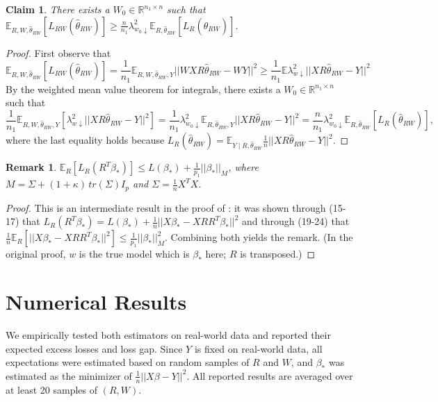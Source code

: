 \documentclass[a4paper,fleqn]{cas-sc}
\theoremstyle{plain}
\newtheorem{remark}[theorem]{Remark}
\newtheorem{claim}[theorem]{Claim}
\newcommand{\R}{\mathbb{R}}
\newcommand{\E}{\mathbb{E}}
\newcommand{\be}{\beta}
\newcommand{\hte}{\hat{\theta}}
\begin{document}
\begin{claim}
\label{claim:05}
There exists a $W_0 \in \R^{n_1 \times 
n}$ such that
$\E_{R, W, \hte_{RW}} 
[L_{RW}(\hte_{RW})] \geq \frac{n}{n_1} 
\lambda^2_{w_0 \downarrow} 
\E_{R, \hte_{RW}} [L_{R}(\hte_{RW})]$. 
\end{claim}
\begin{proof}
First observe that 
\begin{equation}
\E_{R, W, \hte_{RW}} 
[L_{RW}(\hte_{RW})] 
= \frac{1}{n_1} 
\E_{R, W, \hte_{RW}, Y} 
||WXR \hte_{RW} - WY ||^2 
\geq \frac{1}{n_1} 
\E \lambda^2_{w \downarrow} 
||XR \hte_{RW} - Y||^2
\end{equation}    
By the weighted mean value theorem for integrals, there exists a $W_0 \in \R^{n_1 \times n}$ such that 
\begin{equation}
\frac{1}{n_1} 
\E_{R, W, \hte_{RW}, Y}[   
\lambda^2_{w \downarrow} 
||XR \hte_{RW} - Y||^2] 
= \frac{1}{n_1} 
\lambda^2_{w_0 \downarrow} 
\E_{R, \hte_{RW}, Y} 
||XR \hte_{RW} - Y||^2
= \frac{n}{n_1} 
\lambda^2_{w_0 \downarrow} 
\E_{R, \hte_{RW}} [L_R(\hte_{RW})], 
\end{equation}    
where the last equality 
holds because $L_R(\hte_{RW}) 
= \E_{Y \mid R, \hte_{RW}} 
\frac{1}{n} ||XR \hte_{RW} - Y||^2$.
\end{proof}
 
\begin{remark}
\label{rem:priorkaban}
$\E_{R} [L_{R}(R^T\be_*)] 
\leq L(\be_*) + \frac{1}{p_1} 
||\be_*||_M$, 
where $M = \Sigma + (1+\kappa)\, 
tr(\Sigma) I_p$ and 
$\Sigma = \frac{1}{n} X^T X$.     
\end{remark}
\begin{proof}
This is an intermediate result 
in the proof of \citep[Theorem 1]{kaban2014new}: it was shown 
through (15-17) that 
$L_R(R^T \be_*) 
= L(\be_*) + 
\frac{1}{n} ||X \be_* 
- X R R^T \be_*||^2$ 
and through (19-24) that 
$\frac{1}{n} \E_{R} \left[ ||X \be_* 
- X R R^T \be_*||^2 \right]
\leq \frac{1}{p_1} ||\be_*||
^2_{M}$. Combining both yields 
the remark. (In the original 
proof, $w$ is the true model 
which is $\be_*$ here; $R$ 
is transposed.) 
\end{proof}



\section{Numerical Results}

We empirically tested both 
estimators on real-world data 
and reported their expected 
excess losses and loss gap. 
Since $Y$ is fixed on real-world 
data, all expectations were estimated 
based on random samples of $R$ and $W$, 
and $\be_*$ was estimated as the 
minimizer of $\frac{1}{n}||X \be - Y||^2$. 
All reported results are averaged 
over at least 20 samples of $(R,W)$. 
\end{document}
